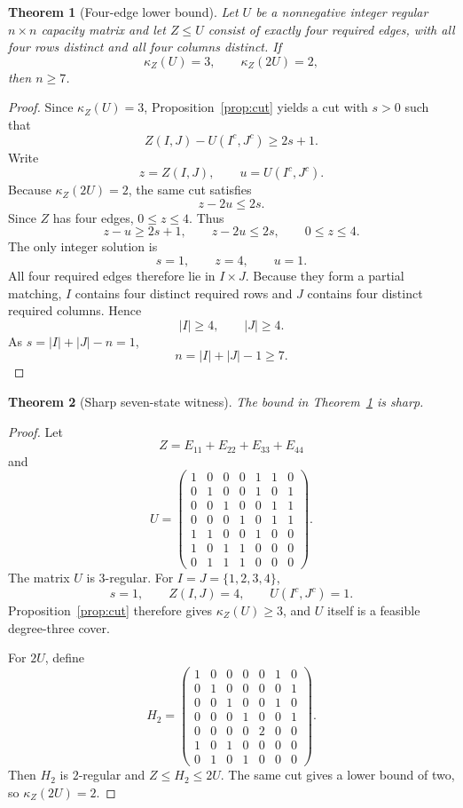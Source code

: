 \documentclass[11pt]{article}
\newtheorem{theorem}{Theorem}[section]
\theoremstyle{definition}
\begin{document}
\begin{theorem}[Four-edge lower bound]
\label{thm:fourlower}
Let $U$ be a nonnegative integer regular $n\times n$ capacity matrix and let $Z\le U$ consist of
exactly four required edges, with all four rows distinct and all four columns distinct.
If
\[
\kappa_Z(U)=3,
\qquad
\kappa_Z(2U)=2,
\]
then $n\ge7$.
\end{theorem}

\begin{proof}
Since $\kappa_Z(U)=3$, Proposition~\ref{prop:cut} yields a cut with $s>0$ such that
\[
Z(I,J)-U(I^c,J^c)\ge2s+1.
\]
Write
\[
z=Z(I,J),
\qquad
u=U(I^c,J^c).
\]
Because $\kappa_Z(2U)=2$, the same cut satisfies
\[
z-2u\le2s.
\]
Since $Z$ has four edges, $0\le z\le4$.  Thus
\[
z-u\ge2s+1,
\qquad
z-2u\le2s,
\qquad
0\le z\le4.
\]
The only integer solution is
\[
s=1,\qquad z=4,\qquad u=1.
\]
All four required edges therefore lie in $I\times J$.
Because they form a partial matching, $I$ contains four distinct required rows and $J$ contains
four distinct required columns.  Hence
\[
|I|\ge4,\qquad |J|\ge4.
\]
As $s=|I|+|J|-n=1$,
\[
n=|I|+|J|-1\ge7.
\]
\end{proof}

\begin{theorem}[Sharp seven-state witness]
\label{thm:fourseven}
The bound in Theorem~\ref{thm:fourlower} is sharp.
\end{theorem}

\begin{proof}
Let
\[
Z=E_{11}+E_{22}+E_{33}+E_{44}
\]
and
\[
U=
\begin{pmatrix}
1&0&0&0&1&1&0\\
0&1&0&0&1&0&1\\
0&0&1&0&0&1&1\\
0&0&0&1&0&1&1\\
1&1&0&0&1&0&0\\
1&0&1&1&0&0&0\\
0&1&1&1&0&0&0
\end{pmatrix}.
\]
The matrix $U$ is $3$-regular.  For $I=J=\{1,2,3,4\}$,
\[
s=1,\qquad Z(I,J)=4,\qquad U(I^c,J^c)=1.
\]
Proposition~\ref{prop:cut} therefore gives $\kappa_Z(U)\ge3$, and $U$ itself is a feasible
degree-three cover.

For $2U$, define
\[
H_2=
\begin{pmatrix}
1&0&0&0&0&1&0\\
0&1&0&0&0&0&1\\
0&0&1&0&0&1&0\\
0&0&0&1&0&0&1\\
0&0&0&0&2&0&0\\
1&0&1&0&0&0&0\\
0&1&0&1&0&0&0
\end{pmatrix}.
\]
Then $H_2$ is $2$-regular and $Z\le H_2\le2U$.
The same cut gives a lower bound of two, so $\kappa_Z(2U)=2$.
\end{proof}
\end{document}
